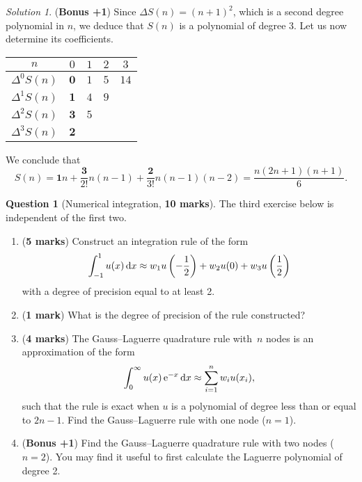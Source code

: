 \documentclass[11pt]{article}
\theoremstyle{definition}
\newtheorem{question}{Question}
\theoremstyle{remark}
\newtheorem*{solution}{Solution}
\begin{document}
\begin{solution}
    \noindent (\textbf{Bonus +1})
    Since $\Delta S(n) = (n+1)^2$,
    which is a second degree polynomial in $n$,
    we deduce that $S(n)$ is a polynomial of degree 3.
    Let us now determine its coefficients.
    \begin{center}
    \begin{tabular}{|c|c|c|c|c|}
        \hline
        $n$    & $0$ & $1$ & $2$ & $3$ \\ \hline
        $\Delta^0 S(n)$ & $\mathbf{0}$ & $1$ & $5$ & $14$ \\ \hline
        $\Delta^1 S(n)$ & $\mathbf{1}$ & $4$ & $9$ &  \\ \hline
        $\Delta^2 S(n)$ & $\mathbf{3}$ & $5$ & & \\ \hline
        $\Delta^3 S(n)$ & $\mathbf{2}$ & & & \\ \hline
    \end{tabular}
    \end{center}
    We conclude that
    \[
        S(n) = \mathbf{1} n + \frac{\mathbf{3}}{2!} n(n-1) + \frac{\mathbf{2}}{3!} n(n-1)(n-2)
        = \frac{n (2n+1) (n+1)}{6}.
    \]
\end{solution}

\newpage
\begin{question}
    [Numerical integration, \textbf{10 marks}]
    The third exercise below is independent of the first two.
    \begin{enumerate}
        \item (\textbf{5 marks})
            Construct an integration rule of the form
            \[
                \int_{-1}^{1} u(x) \, \mathrm d x \approx w_1 u\left(-\frac{1}{2} \right) + w_2 u(0) +  w_3 u\left(\frac{1}{2} \right)
            \]
            with a degree of precision equal to at least 2.

        \item
            (\textbf{1 mark})
            What is the degree of precision of the rule constructed?

        \item
            (\textbf{4 marks})
            The Gauss--Laguerre quadrature rule with~$n$ nodes is an approximation of the form
            \[
                \int_{0}^{\infty} u(x) \, \mathrm e^{-x} \, \mathrm d x \approx \sum_{i=1}^{n} w_i u(x_i),
            \]
            such that the rule is exact when $u$ is a polynomial of degree less than or equal to $2n-1$.
            Find the Gauss--Laguerre rule with one node ($n = 1$).

        \item (\textbf{Bonus +1})
            Find the Gauss--Laguerre quadrature rule with two nodes ($n = 2$).
            You may find it useful to first calculate the Laguerre polynomial of degree 2.
    \end{enumerate}
\end{question}
\end{document}
